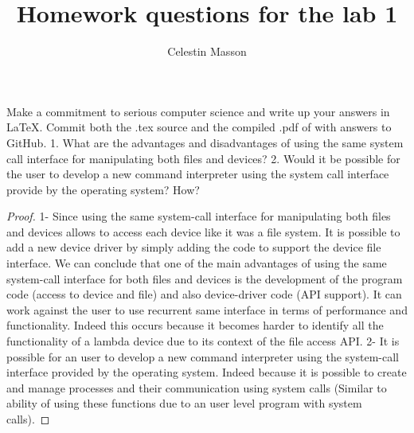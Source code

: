 \documentclass[12pt]{article}
\newenvironment{problem}[2][Problem]{\begin{trivlist}
\item[\hskip \labelsep {\bfseries #1}\hskip \labelsep {\bfseries #2.}]}{\end{trivlist}}
\begin{document}
 
 
\title{Homework questions for the lab 1}
\author{Celestin Masson}
\maketitle
 
\begin{problem}
{Write in LaTeX} 
Make	a	commitment	to	serious	computer	science	and	write	up	your	answers	in	LaTeX.	
Commit	both	the	.tex	source	and	the	compiled	.pdf		of	with	answers	to	GitHub.	
1. What	are	the	advantages	and	disadvantages	of	using	the	same	system	call	interface	
for	manipulating	both	files	and	devices? 
2. Would	it	be	possible	for	the	user	to	develop	a	new	command	interpreter	using	the	
system	call	interface	provide	by	the	operating	system?	How?
\end{problem}
 
\begin{proof}{1-} \newline
Since using the same system-call interface for manipulating both files and devices allows to access each device like it was a file system. It is possible to add a new device driver by simply adding the code to support the device file interface. We can conclude that one of the main advantages of using the same system-call interface for both files and devices is the development of the program code (access to device and file) and also device-driver code (API support). \newline
It can work against the user to use recurrent same interface in terms of performance and functionality. Indeed this occurs because it becomes harder to identify all the functionality of a lambda  device due to its context of the file access API. \newline
{2-} \newline 
It is possible for an user to develop a new command interpreter using the system-call interface provided by the operating system. Indeed because it is possible to create and manage processes and their communication using system calls (Similar to ability of using these functions due to an user level program with system calls).
\end{proof}
\end{document}
